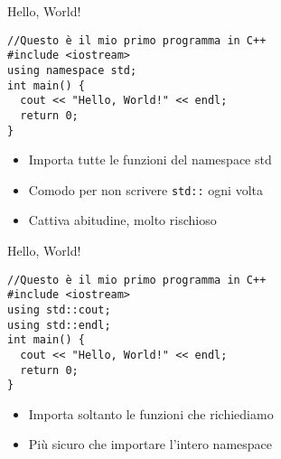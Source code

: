 \documentclass[xcolor=dvipsnames,handout]{beamer}
\begin{document}
\begin{frame}[fragile]{Hello, World!}
  \vfill
  \begin{lstlisting}
//Questo è il mio primo programma in C++
#include <iostream>
using namespace std;
int main() {
  cout << "Hello, World!" << endl;
  return 0;
}
  \end{lstlisting}
  \vfill
  \begin{itemize}
    \item Importa \alert{tutte} le funzioni del namespace std
    \vfill
    \item Comodo per non scrivere \lstinline$std::$ ogni volta
    \vfill
    \item Cattiva abitudine, molto rischioso
  \end{itemize}
  \vfill
\end{frame}

\begin{frame}[fragile]{Hello, World!}
  \vfill
  \begin{lstlisting}
//Questo è il mio primo programma in C++
#include <iostream>
using std::cout;
using std::endl;
int main() {
  cout << "Hello, World!" << endl;
  return 0;
}
  \end{lstlisting}
  \vfill
  \begin{itemize}
    \item Importa soltanto le funzioni che richiediamo
    \vfill
    \item Più sicuro che importare l'intero namespace
  \end{itemize}
  \vfill
\end{frame}
\end{document}
